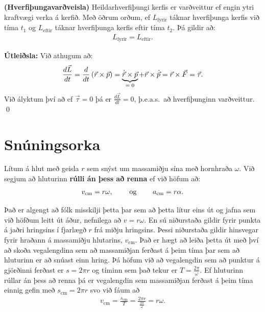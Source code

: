 \ifdefined \wholebook \else\documentclass[oneside]{book}\usepackage{EdlBook}\graphicspath{{figures/}}
\begin{document}
\begin{tcolorbox}
\begin{theorem}
\textbf{(Hverfiþungavarðveisla)} Heildarhverfiþungi kerfis er varðveittur ef engin ytri kraftvægi verka á kerfið. Með öðrum orðum, ef $L_{\text{fyrir}}$ táknar hverfiþunga kerfis við tíma $t_1$ og $L_{\text{eftir}}$ táknar hverfiþunga kerfis eftir tíma $t_2$. Þá gildir að:
\begin{align*}
    L_{\text{fyrir}} = L_{\text{eftir}}.
\end{align*}
\end{theorem}
\end{tcolorbox}

\textbf{Útleiðsla:} Við athugum að:
\begin{align*}
    \frac{d\vec{L}}{dt} = \frac{d}{dt}\left( \vec{r} \times \vec{p} \right) = \underbrace{\dot{\vec{r}} \times \vec{p}}_\textrm{$=0$} + \vec{r}\times \dot{\vec{p}} = \vec{r}\times \vec{F} = \vec{\tau}.
\end{align*}
Við ályktum því að ef $\vec{\tau} = 0$ þá er $\frac{d\vec{L}}{dt} = 0$, þ.e.a.s.~að hverfiþunginn varðveittur. \qed

\section{Snúningsorka}

\begin{tcolorbox}
\begin{definition}
Lítum á hlut með geisla $r$ sem snýst um massamiðju sína með hornhraða $\omega$. Við segjum að hluturinn \textbf{rúlli án þess að renna} ef við höfum að:
\begin{align*}
    v_{\text{cm}} = r\omega, \hspace{0.8cm} \text{og} \hspace{0.8cm} a_{\text{cm}} = r\alpha.
\end{align*}
\end{definition}
\end{tcolorbox}
Það er algengt að fólk misskilji þetta þar sem að þetta lítur eins út og jafna sem við höfðum leitt út áður, nefnilega að $v = r\omega$. En sú niðurstaða gildir fyrir punkta á jaðri hringsins í fjarlægð $r$ frá miðju hringsins. Þessi niðurstaða gildir hinsvegar fyrir hraðann á massamiðju hlutarins, $v_{\text{cm}}$. Það er hægt að leiða þetta út með því að skoða vegalengdina sem að massamiðjan ferðast á þeim tíma þar sem að hluturinn er að snúast einn hring. Þá höfum við að vegalengdin sem að punktur á gjörðinni ferðast er $s = 2\pi r$ og tíminn sem það tekur er $T = \frac{2\pi}{\omega}$. Ef hluturinn rúllar án þess að renna þá er vegalengdin sem massamiðjan ferðast á þeim tíma einnig gefin með $s_{\text{cm}} = 2\pi r$ svo við fáum að
\begin{align*}
    v_{\text{cm}} = \frac{s_{\text{cm}}}{T} = \frac{2\pi r}{\frac{2\pi}{\omega}} = r \omega.
\end{align*}
\end{document}
